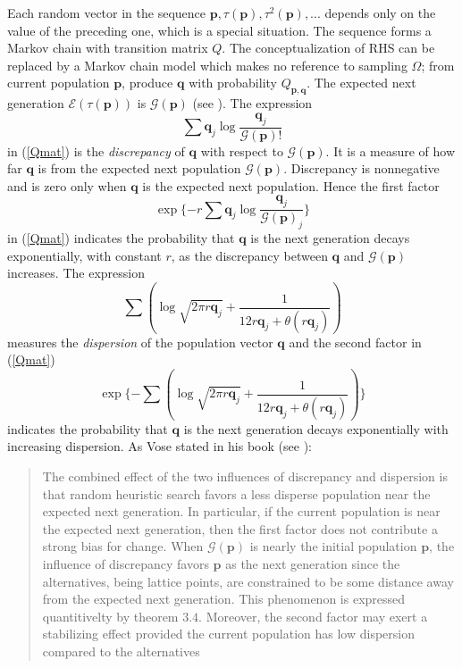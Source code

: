 Each random vector in the sequence $\bm{p}, \tau(\bm{p}), \tau^2(\bm{p}),...$ depends only on the value of the preceding one, 
which is a special situation. The sequence forms a Markov chain with transition matrix $Q$. 
The conceptualization of RHS can be replaced by a Markov chain model which makes no reference to sampling $\Omega$; 
from current population $\bm{p}$, produce $\bm{q}$ with probability $Q_{\bm{p},\bm{q}}$. The expected next generation 
$\mathcal{E}(\tau (\bm{p}))$ is $\mathcal{G}(\bm{p})$ (see \cite{Vose1999}). The expression 
\[
\sum \bm{q}_j \log \frac{\bm{q}_j}{\mathcal{G}(\bm{p})!}
\]
in (\ref{Qmat}) is the {\em discrepancy} of $\bm{q}$ with respect to $\mathcal{G}(\bm{p})$. It is a measure of how far $\bm{q}$ is from the expected next population 
$\mathcal{G}(\bm{p})$. Discrepancy is nonnegative and is zero only when $\bm{q}$ is the expected next population. Hence the first factor 
\[
\exp\{-r \sum \bm{q}_j \log \frac{\bm{q}_j}{\mathcal{G}(\bm{p})_j}\}
\]
in (\ref{Qmat}) indicates the probability that $\bm{q}$ is the next generation
decays exponentially, with constant $r$, as the discrepancy between $\bm{q}$ and $\mathcal{G}(\bm{p})$ increases.
The expression 
\[
\sum (\log \sqrt{2 \pi r\bm{q}_j} + \frac{1}{12r\bm{q}_j + \theta (r\bm{q}_j)})
\]
measures the {\em dispersion} of the population vector $\bm{q}$ and the second factor in (\ref{Qmat}) 
\[
\exp\{- \sum (\log \sqrt{2 \pi r\bm{q}_j} + \frac{1}{12r\bm{q}_j + \theta (r\bm{q}_j)})\}
\]
indicates the probability that $\bm{q}$ is the next generation decays exponentially with increasing dispersion. 
As Vose stated in his book (see \cite{Vose1999}):
\begin{quote}
The combined effect of the two influences of discrepancy and dispersion is that random heuristic search favors a less disperse 
population near the expected next generation. In particular, if the current population is near the expected next generation, 
then the first factor does not contribute a strong bias for change. When $\mathcal{G}(\bm{p})$ is nearly the initial population 
$\bm{p}$, the influence of discrepancy favors $\bm{p}$ as the next generation since the alternatives, being lattice points, 
are constrained to be some distance away from the expected next generation. This phenomenon is expressed quantitivelty by theorem $3.4$.
Moreover, the second factor may exert a stabilizing effect provided the current population has low dispersion compared to the alternatives
\end{quote}

